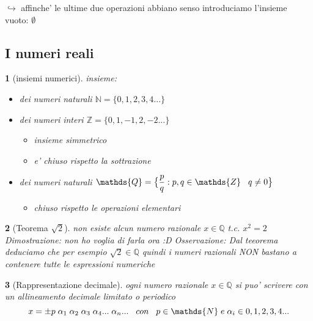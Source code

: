 \documentclass{article}
\theoremstyle{mystyle}
\newtheorem*{mydefinition}{}
\begin{document}
$\hookrightarrow$ affinche' le ultime due operazioni abbiano senso introduciamo l'insieme vuoto: $\emptyset$ 

\subsection{ I numeri reali}
\begin{mydefinition}[insiemi numerici] 
insieme:
\newline
    \begin{itemize}
        \item  dei \emph{numeri naturali} $\mathds{N}=\{ 0,1,2,3,4... \}$
        \item  dei \emph{numeri interi} $\mathds{Z}=\{ 0,1,-1,2,-2... \}$
        \begin{itemize}
            \item insieme simmetrico
            \item e' chiuso rispetto la sottrazione
        \end{itemize}
        \item  dei \emph{numeri naturali} $\mathds{Q}= \bigl \{ \dfrac{p}{q}:p,q\in \mathds{Z} \hspace{3mm} q\neq 0 \bigr \}$
        \begin{itemize}
            \item  chiuso rispetto le operazioni elementari
        \end{itemize}
        
    \end{itemize}
\end{mydefinition}

\begin{mydefinition}[Teorema $\sqrt{2}$]
    non esiste alcun numero razionale   $x \in \mathds{Q}$ t.c. $x^2=2$
    \newline
    \emph{Dimostrazione}: \newline
    non ho voglia di farla ora :D
    \emph{Osservazione}: 
    \newline
    Dal teeorema deduciamo che per esempio $\sqrt{2} \in \mathds{Q}$ quindi i numeri razionali NON bastano a contenere tutte le espressioni numeriche
\end{mydefinition}

\begin{mydefinition}[Rappresentazione decimale]
ogni numero razionale $x \in \mathds{Q}$ si puo' scrivere con un allineamento decimale limitato o periodico
$$  x=\pm p \; \alpha_1 \; \alpha_2 \; \alpha_3 \; \alpha_4... \;\alpha_n... \hspace{3mm} con \hspace{3mm} p \in \mathds{N} \;e \;\alpha_i \in {0,1,2,3,4...}
$$
  
\end{mydefinition}
\end{document}
